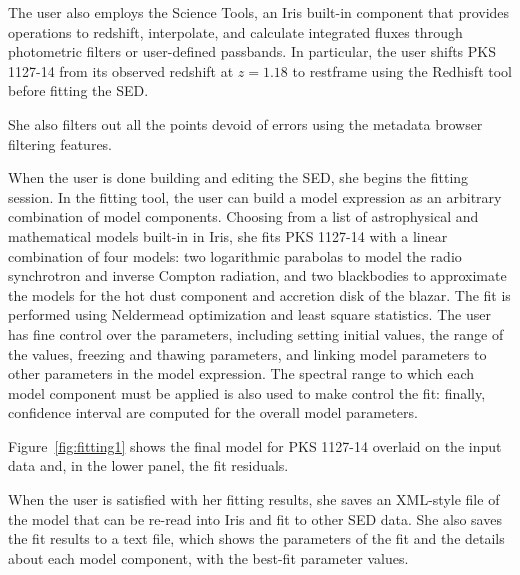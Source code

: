 \documentclass[final,5p]{elsarticle}
\begin{document}
The user also employs the Science Tools, an Iris built-in component that provides operations to redshift, interpolate, and calculate integrated fluxes through photometric filters or user-defined passbands. In particular, the user shifts PKS 1127-14 from its observed redshift at $z=1.18$ to restframe using the Redhisft tool before fitting the SED.

She also filters out all the points devoid of errors using the metadata browser filtering features.

When the user is done building and editing the SED, she begins the fitting session. In the fitting tool, the user can build a model expression as an arbitrary combination of model components. Choosing from a list of astrophysical and mathematical models built-in in Iris, she fits PKS 1127-14 with a linear combination of four models: two logarithmic parabolas to model the radio synchrotron and inverse Compton radiation, and two blackbodies to approximate the models for the hot dust component and accretion disk of the blazar. The fit is performed using Neldermead optimization and least square statistics. The user has fine control over the parameters, including setting initial values, the range of the values, freezing and thawing parameters, and linking model parameters to other parameters in the model expression. The spectral range to which each model component must be applied is also used to make control the fit: finally, confidence interval are computed for the overall model parameters.

Figure~\ref{fig:fitting1} shows the final model for PKS 1127-14 overlaid on the input data and, in the lower panel, the fit residuals.

When the user is satisfied with her fitting results, she saves an XML-style file of the model that can be re-read into Iris and fit to other SED data. She also saves the fit results to a text file, which shows the parameters of the fit and the details about each model component, with the best-fit parameter values.



\end{document}
